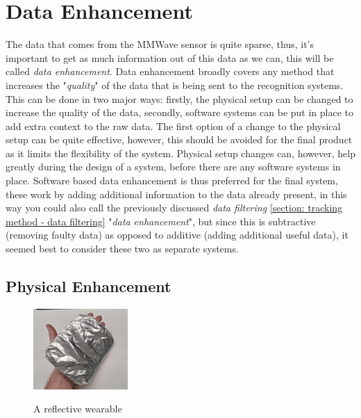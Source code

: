 
\section{Data Enhancement}
\label{section: tracking method - data enhancement}


The data that comes from the MMWave sensor is quite sparse, thus, it's important to get as much information out of this data as we can, this will be called \textit{data enhancement}.
Data enhancement broadly covers any method that increases the "\textit{quality}" of the data that is being sent to the recognition systems.
This can be done in two major ways: firstly, the physical setup can be changed to increase the quality of the data, secondly, software systems can be put in place to add extra context to the raw data.
The first option of a change to the physical setup can be quite effective, however, this should be avoided for the final product as it limits the flexibility of the system.
Physical setup changes can, however, help greatly during the design of a system, before there are any software systems in place.
Software based data enhancement is thus preferred for the final system, these work by adding additional information to the data already present, in this way you could also call the previously discussed \textit{data filtering} \ref{section: tracking method - data filtering} "\textit{data enhancement}", but since this is subtractive (removing faulty data) as opposed to additive (adding additional useful data), it seemed best to consider these two as separate systems.

\subsection{Physical Enhancement}
\label{sub-section: tracking method - data enhancement - physical enhancement}

\begin{figure}
    \caption{A reflective wearable}
    \centering
    \includegraphics[width=0.32\textwidth]{figures/reflective wearable.png}
    \label{fig: reflective glove wearable}
\end{figure}

